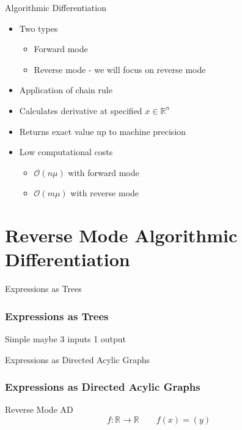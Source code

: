 \documentclass{beamer}
\begin{document}
\begin{frame}{Algorithmic Differentiation}
    \begin{itemize}
        \item Two types
            \begin{itemize}
                \item Forward mode
                \item Reverse mode - we will focus on reverse mode
            \end{itemize}
        \item Application of chain rule
        \item Calculates derivative at specified $x \in \mathbb{R}^n$
        \item Returns \alert{exact} value up to machine precision
        \item Low computational costs
            \begin{itemize}
                \item $\mathcal{O}(n \mu)$ with forward mode
                \item $\mathcal{O}(m \mu)$ with reverse mode
            \end{itemize}
    \end{itemize}
\end{frame}


\section{Reverse Mode Algorithmic Differentiation}

\begin{frame}{Expressions as Trees}
\frametitle{Expressions as Trees}
Simple maybe 3 inputs 1 output
\end{frame}

\begin{frame}{Expressions as Directed Acylic Graphs}
    \frametitle{Expressions as Directed Acylic Graphs}
\end{frame}

\begin{frame}{Reverse Mode AD}
    \begin{equation*}
            f: \mathbb{R} \longrightarrow \mathbb{R} \qquad
            f(x) = (y)
    \end{equation*}
\end{frame}
\end{document}
